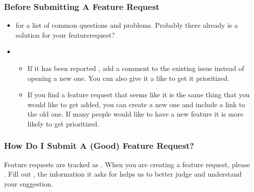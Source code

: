 \documentclass[a4paper,10pt,english]{sphinxmanual}
\begin{document}
\subsubsection{Before Submitting A Feature Request}
\label{\detokenize{CONTRIBUTING:before-submitting-a-feature-request}}\begin{itemize}
\item {}
\sphinxAtStartPar
{} for a list of common questions and problems. Probably there already is a solution for your feature\sphinxhyphen{}request?

\item {}
\sphinxAtStartPar
{}
\begin{itemize}
\item {}
\sphinxAtStartPar
If it has been reported , add a comment to the existing issue instead of opening a new one. You can also give it a like to get it prioritized.

\item {}
\sphinxAtStartPar
If you find a  feature request that seems like it is the same thing that you would like to get added, you can create a new one and include a link to the old one. If many people would like to have a new feature it is more likely to get prioritized.

\end{itemize}

\end{itemize}


\subsubsection{How Do I Submit A (Good) Feature Request?}
\label{\detokenize{CONTRIBUTING:how-do-i-submit-a-good-feature-request}}
\sphinxAtStartPar
Feature requests are tracked as . When you are creating a feature request, please {\hyperref[\detokenize{CONTRIBUTING:how-do-i-submit-a-good-feature-request}]{}}. Fill out , the information it asks for helps us to better judge and understand your suggestion.
\end{document}
